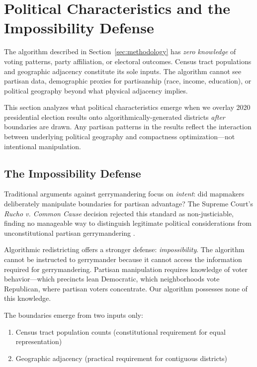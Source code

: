 \section{Political Characteristics and the Impossibility Defense}
\label{sec:analysis}

The algorithm described in Section~\ref{sec:methodology} has \textit{zero knowledge} of voting patterns, party affiliation, or electoral outcomes. Census tract populations and geographic adjacency constitute its sole inputs. The algorithm cannot see partisan data, demographic proxies for partisanship (race, income, education), or political geography beyond what physical adjacency implies.

This section analyzes what political characteristics emerge when we overlay 2020 presidential election results onto algorithmically-generated districts \textit{after} boundaries are drawn. Any partisan patterns in the results reflect the interaction between underlying political geography and compactness optimization—not intentional manipulation.

\subsection{The Impossibility Defense}

Traditional arguments against gerrymandering focus on \textit{intent}: did mapmakers deliberately manipulate boundaries for partisan advantage? The Supreme Court's \textit{Rucho v. Common Cause} decision rejected this standard as non-justiciable, finding no manageable way to distinguish legitimate political considerations from unconstitutional partisan gerrymandering \cite{rucho2019}.

Algorithmic redistricting offers a stronger defense: \textit{impossibility}. The algorithm cannot be instructed to gerrymander because it cannot access the information required for gerrymandering. Partisan manipulation requires knowledge of voter behavior—which precincts lean Democratic, which neighborhoods vote Republican, where partisan voters concentrate. Our algorithm possesses none of this knowledge.

The boundaries emerge from two inputs only:
\begin{enumerate}
    \item Census tract population counts (constitutional requirement for equal representation)
    \item Geographic adjacency (practical requirement for contiguous districts)
\end{enumerate}

